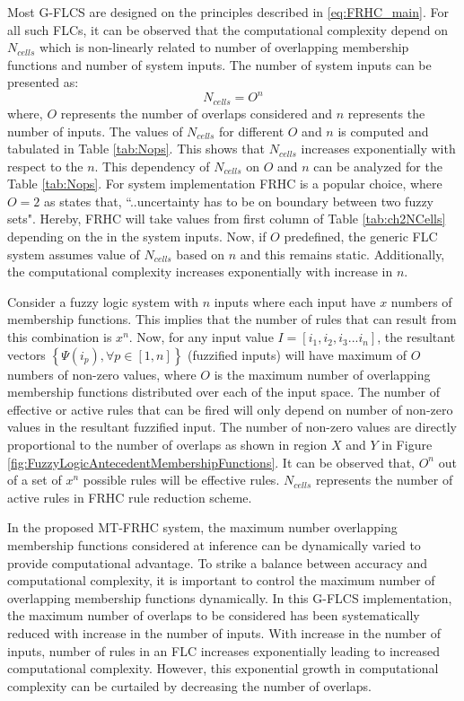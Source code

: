 Most G-FLCS are designed on the principles described in \eqref{eq:FRHC_main}. For all such FLCs, it can be observed that the computational complexity depend on $ N_{cells} $ which is non-linearly related to number of overlapping membership functions and number of system inputs. The number of system inputs can be presented as:
\begin{equation} \label{eq:ncells}
N_{cells} = {O}^n
\end{equation}
where, $O$ represents the number of overlaps considered and $n$ represents the number of inputs. The values of $ N_{cells} $ for different $O$ and $ n $ is computed and tabulated in Table \ref{tab:Nops}. This shows that $ N_{cells} $ increases exponentially with respect to the $ n $. This dependency of $ N_{cells} $ on $ O $ and $ n $ can be analyzed for the Table \ref{tab:Nops}. For system implementation FRHC is a popular choice, where $ O = 2 $ as \cite{Kalaykov1999} states that, ``..uncertainty has to be on boundary between two fuzzy sets". Hereby, FRHC will take values from first column of Table \ref{tab:ch2NCells} depending on the in the system inputs. Now, if $O$ predefined, the generic FLC system assumes value of $ N_{cells} $ based on $n$ and this remains static. Additionally, the computational complexity increases exponentially with increase in $n$. 

Consider a fuzzy logic system with $ n $ inputs where each input have $ x $ numbers of membership functions. This implies that the number of rules that can result from this combination is $ x^{n} $. Now, for any input value $I = \left[ {{i_1},{i_2},{i_3}...{i_n}} \right]$, the resultant vectors $ \left\{ {\Psi ({i_p}),\forall p \in \left[ {1,n} \right]} \right\} $ (fuzzified inputs) will have maximum of $ O $ numbers of non-zero values, where $ O $ is the maximum number of overlapping membership functions distributed over each of the input space. The number of effective or active rules that can be fired will only depend on number of non-zero values in the resultant fuzzified input. The number of non-zero values are directly proportional to the number of overlaps as shown in region $ X $ and $ Y  $ in Figure \ref{fig:FuzzyLogicAntecedentMembershipFunctions}. It can be observed that, $ O^{n} $ out of a set of $ x^{n} $ possible rules will be effective rules. $ N_{cells} $ represents the number of active rules in FRHC rule reduction scheme.

In the proposed MT-FRHC system, the maximum number overlapping membership functions considered at inference can be dynamically varied to provide computational advantage. To strike a balance between accuracy and computational complexity, it is important to control the maximum number of overlapping membership functions dynamically. In this G-FLCS implementation, the maximum number of overlaps to be considered has been systematically reduced with increase in the number of inputs. With increase in the number of inputs, number of rules in an FLC increases exponentially leading to increased computational complexity. However, this exponential growth in computational complexity can be curtailed by decreasing the number of overlaps.

